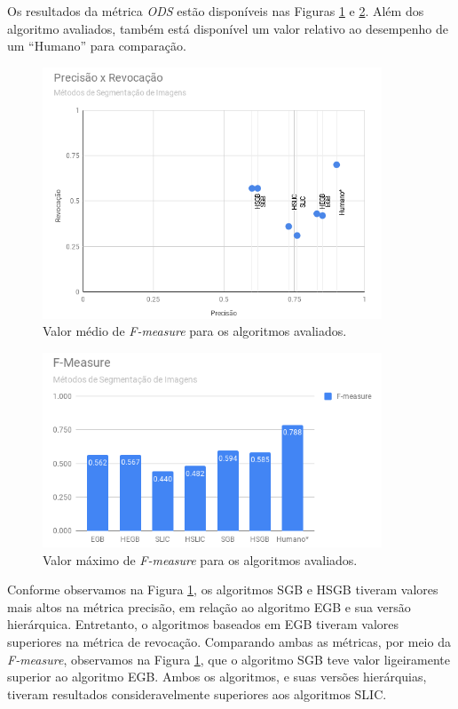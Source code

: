 \begin{document}
Os resultados da métrica \textit{ODS} estão disponíveis nas Figuras \ref{gra:PREC_RECALL} e \ref{gra:FMEASURE}. Além dos algoritmo avaliados, também está disponível um valor relativo ao desempenho de um ``Humano'' para comparação.

\begin{figure}[ht]
\centering
\includegraphics[width=0.9\textwidth]{graph_precision_recall.png}
\caption{Valor médio de \textit{F-measure} para os algoritmos avaliados.}
\label{gra:PREC_RECALL}
\end{figure}

\begin{figure}[ht]
\centering
\includegraphics[width=0.90\textwidth]{graph_fmeasure.png}
\caption{Valor máximo de \textit{F-measure} para os algoritmos avaliados.}
\label{gra:FMEASURE}
\end{figure}

Conforme observamos na Figura \ref{gra:PREC_RECALL}, os algoritmos SGB e HSGB tiveram valores mais altos na métrica precisão, em relação ao algoritmo EGB e sua versão hierárquica. Entretanto, o algoritmos baseados em EGB tiveram valores superiores na métrica de revocação. Comparando ambas as métricas, por meio da \textit{F-measure}, observamos na Figura \ref{gra:PREC_RECALL}, que o algoritmo SGB teve valor ligeiramente superior ao algoritmo EGB. Ambos os algoritmos, e suas versões hierárquias, tiveram resultados consideravelmente superiores aos algoritmos SLIC.
\end{document}

